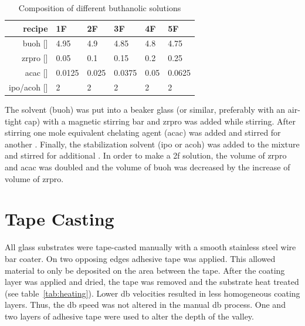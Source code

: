 \begin{table}[h]
	\centering
	\caption{Composition of different buthanolic solutions}
	\label{tab:rec2}
	\begin{tabular}{rlllll}
		\hline
		recipe	&1F		&2F		&3F		&4F		&5F		\\
		\hline
		\gls{buoh} [\ml{}]		&4.95	&4.9	&4.85	&4.8	&4.75	\\
		\gls{zrpro} [\ml{}]	&0.05	&0.1	&0.15	&0.2	&0.25	\\
		\gls{acac} [\ml{}]		&0.0125	&0.025	&0.0375	&0.05	&0.0625	\\
		\gls{ipo}/\gls{acoh} [\ml{}]		&2		&2		&2		&2		&2		\\
		\hline
	\end{tabular}
\end{table}

The solvent (\gls{buoh}) was put into a beaker glass (or similar, preferably with an 
air-tight cap) with a magnetic stirring bar and \gls{zrpro} was added while stirring. After 
stirring  one mole equivalent chelating agent (\gls{acac}) was 
added and stirred for another . Finally, the stabilization 
solvent\cite{Hu2016} (\gls{ipo} or \gls{acoh}) was added to the mixture and stirred for 
additional . 
In order to make a \gls{2f} solution, the volume of \gls{zrpro} and \gls{acac} was 
doubled and the volume of \gls{buoh} was decreased by the increase of volume of \gls{zrpro}. 

\section{Tape Casting}
\label{sec:exp-db}
All glass substrates were tape-casted manually with a smooth stainless steel wire bar coater. 
On two opposing edges adhesive tape was applied. %
This allowed material to only be deposited on the area between the tape.
After the coating layer was applied and dried, the tape was removed and the substrate heat treated (see table~\ref{tab:heating}).
Lower \gls{db} velocities resulted in less homogeneous coating layers.
Thus, the \gls{db} speed was not altered in the manual \gls{db} process. 
One and two layers of adhesive tape were used to alter the depth of the valley. 


